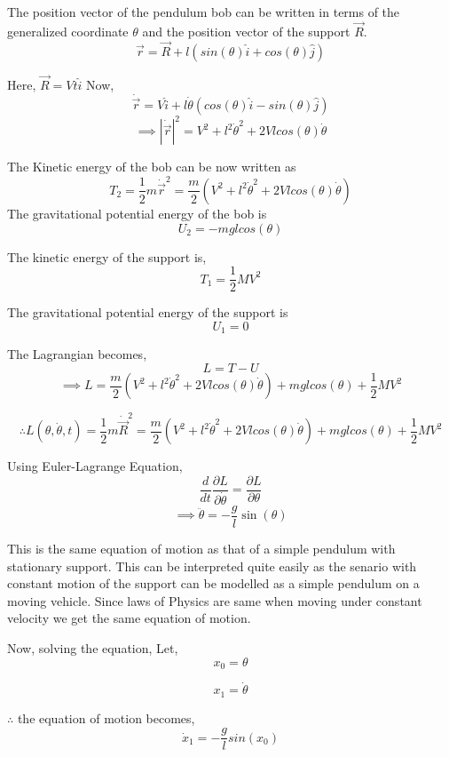 \documentclass{article}
\begin{document}
	The position vector of the pendulum bob can be written in terms of the generalized coordinate $\theta$ and the position vector of the support $ \vec{R} $.
	\[ \vec{r} = \vec{R} + l(sin(\theta) \hat{i} + cos(\theta) \hat{j} )\]
	
	Here, $ \vec{R} = Vt\hat{i} $
	Now,
	\[ \dot{\vec{r}}  = V\hat{i} + l\dot{\theta}( cos(\theta) \hat{i} - sin(\theta)\hat{j} )\]
	\[ \implies |\dot{\vec{r}}|^2 = V^2 + l^2\dot{\theta}^2 + 2Vlcos(\theta)\dot{\theta} \]	
	
	The Kinetic energy of the bob can be now written as 
	\[ T_2 = \frac{1}{2}m\dot{\vec{r}}^2 = \frac{m}{2}(V^2 + l^2\dot{\theta}^2 + 2Vlcos(\theta)\dot{\theta}) \]
	 The gravitational potential energy of the bob is
	\[ U_2 = -mglcos(\theta) \]
	 
	The kinetic energy of the support is,
	\[ T_1 = \frac{1}{2}MV^2 \]
	  
	The gravitational potential energy of the support is
	\[ U_1 = 0\]
	 
	The Lagrangian becomes,
	\[ L = T- U \]
	\[ \implies L  = \frac{m}{2}(V^2 + l^2\dot{\theta}^2 + 2Vlcos(\theta)\dot{\theta}) + mglcos(\theta) + \frac{1}{2}MV^2  \]
	
	\[ \therefore  L(\theta,\dot{\theta},t) = \frac{1}{2}m\dot{\vec{R}}^2 = \frac{m}{2}(V^2 + l^2\dot{\theta}^2 + 2Vlcos(\theta)\dot{\theta}) + mglcos(\theta) + \frac{1}{2}MV^2 \]
	
	Using Euler-Lagrange Equation,
	\[ \frac{d}{dt}\frac{\partial L}{\partial \dot{\theta}} = \frac{\partial L}{\partial \theta} \]
	\[ \implies \ddot{\theta} = -\frac{g}{l}\sin(\theta)  \]
	
	This is the same equation of motion as that of a simple pendulum with stationary support. This can be interpreted quite easily as the senario with constant motion of the support can be modelled as a simple pendulum on a moving vehicle. Since laws of Physics are same when moving under constant velocity we get the same equation of motion.
	
	Now, solving the equation,
	Let,
	\begin{equation}
		x_0 = \theta 	
	\end{equation}

	\begin{equation}\label{key}
		x_1 = \dot{\theta}
	\end{equation}

	$\therefore$ the equation of motion becomes,
	\[  \dot x_1 = -\frac{g}{l}sin(x_0) \]
	
\end{document}
